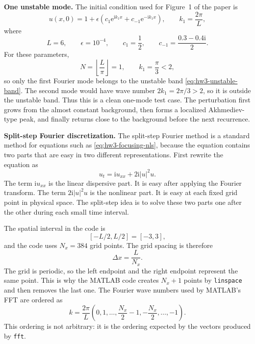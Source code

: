 \documentclass{amsart}
\newcounter{hw}
\newcounter{note}
\numberwithin{equation}{hw}
\newcommand{\noteheading}[1]{\vspace{1em}\noindent\textbf{#1}}
\begin{document}
\noteheading{One unstable mode.}
The initial condition used for Figure~1 of the paper is
\begin{equation}
u(x,0)
=
1
+
\epsilon
\left(
c_1\mathrm{e}^{\mathrm{i}k_1x}
+
c_{-1}\mathrm{e}^{-\mathrm{i}k_1x}
\right),
\qquad
k_1=\frac{2\pi}{L},
\label{eq:hw3-initial-data}
\end{equation}
where
\begin{equation}
L=6,
\qquad
\epsilon=10^{-4},
\qquad
c_1=\frac{1}{2},
\qquad
c_{-1}=\frac{0.3-0.4\mathrm{i}}{2}.
\label{eq:hw3-paper-parameters}
\end{equation}
For these parameters,
\begin{equation}
N
=
\left\lfloor \frac{L}{\pi}\right\rfloor
=1,
\qquad
k_1
=
\frac{\pi}{3}
<2,
\label{eq:hw3-one-mode-condition}
\end{equation}
so only the first Fourier mode belongs to the unstable band
\eqref{eq:hw3-unstable-band}.  The second mode would have wave number
\(2k_1=2\pi/3>2\), so it is outside the unstable band.  Thus this is a
clean one-mode test case.  The perturbation first grows from the almost
constant background, then forms a localized Akhmediev-type peak, and
finally returns close to the background before the next recurrence.

\noteheading{Split-step Fourier discretization.}
The split-step Fourier method is a standard method for equations such as
\eqref{eq:hw3-focusing-nls}, because the equation contains two parts that
are easy in two different representations.  First rewrite the equation as
\begin{equation}
u_t
=
\mathrm{i}u_{xx}
+2\mathrm{i}|u|^2u.
\label{eq:hw3-evolution-form}
\end{equation}
The term \(\mathrm{i}u_{xx}\) is the linear dispersive part.  It is easy
after applying the Fourier transform.  The term
\(2\mathrm{i}|u|^2u\) is the nonlinear part.  It is easy at each fixed
grid point in physical space.  The split-step idea is to solve these two
parts one after the other during each small time interval.

The spatial interval in the code is
\[
[-L/2,L/2]=[-3,3],
\]
and the code uses \(N_x=384\) grid points.  The grid spacing is therefore
\[
\Delta x=\frac{L}{N_x}.
\]
The grid is periodic, so the left endpoint and the right endpoint
represent the same point.  This is why the MATLAB code creates \(N_x+1\)
points by \texttt{linspace} and then removes the last one.  The Fourier
wave numbers used by MATLAB's FFT are ordered as
\begin{equation}
k
=
\frac{2\pi}{L}
\left(
0,1,\ldots,\frac{N_x}{2}-1,
-\frac{N_x}{2},\ldots,-1
\right).
\label{eq:hw3-fft-wavenumbers}
\end{equation}
This ordering is not arbitrary: it is the ordering expected by the
vectors produced by \texttt{fft}.
\end{document}
